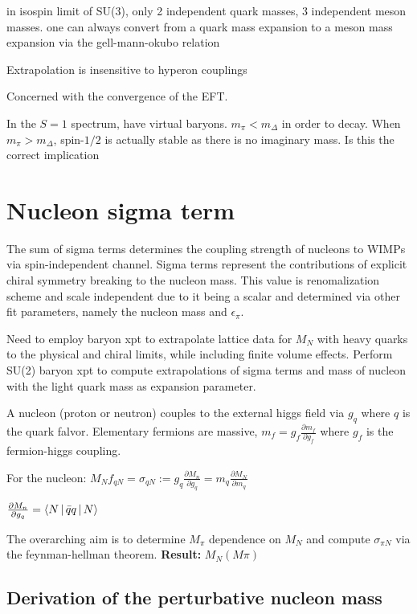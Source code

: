 \documentclass[12pt,tightenlines, raggedbottom, prd, notitlepage]{revtex4-1}
\begin{document}
in isospin limit of SU(3), only 2 independent quark masses, 3 independent meson masses.
one can always convert from a quark mass expansion to a meson mass expansion via the gell-mann-okubo relation

Extrapolation is insensitive to hyperon couplings

Concerned with the convergence of the EFT. 

In the $S=1$ spectrum, have virtual baryons. 
$m_\pi < m_\Delta$ in order to decay. 
When $m_\pi > m_\Delta$, spin-$1/2$ is actually stable as there is no imaginary mass. Is this the correct implication

\section*{Nucleon sigma term}

The sum of sigma terms determines the coupling strength of nucleons to WIMPs via spin-independent channel. 
Sigma terms represent the contributions of explicit chiral symmetry breaking to the nucleon mass. This value is renomalization
scheme and scale independent due to it being a scalar and determined via other fit parameters, namely the nucleon mass 
and $\epsilon_\pi$.  

Need to employ baryon xpt to extrapolate lattice data for $M_N$ with heavy quarks to the physical
and chiral limits, while including finite volume effects. Perform SU(2) baryon xpt to compute 
extrapolations of sigma terms and mass of nucleon with the light quark mass as expansion parameter. 


A nucleon (proton or neutron) couples to the external higgs field via $g_q$ where $q$
is the quark falvor. Elementary fermions are massive, $m_f = g_f\frac{\partial m_f}{\partial g_f}$ where 
$g_f$ is the fermion-higgs coupling. 

For the nucleon: $M_Nf_{qN} = \sigma_{qN} := g_q\frac{\partial M_n}{\partial g_q} = m_q\frac{\partial M_N}{\partial m_q}$

$ \frac{\partial M_n}{\partial g_q} = \Braket{N | \bar{q}q | N}$

The overarching aim is to determine $M_\pi$ dependence on $M_N$ and compute $\sigma_{\pi N}$ 
via the feynman-hellman theorem. 
\textbf{Result:} $M_N(M\pi)$

\subsection*{Derivation of the perturbative nucleon mass}
\end{document}
